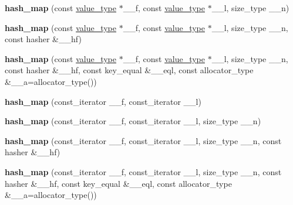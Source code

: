 \begin{DoxyCompactItemize}
{\bfseries hash\+\_\+map} (const \hyperlink{structpair}{value\+\_\+type} $\ast$\+\_\+\+\_\+f, const \hyperlink{structpair}{value\+\_\+type} $\ast$\+\_\+\+\_\+l, size\+\_\+type \+\_\+\+\_\+n)
\item 
\mbox{\label{classhash__map_a50c1ed14be6a9be4ea121e1d2ce2a180}} 
{\bfseries hash\+\_\+map} (const \hyperlink{structpair}{value\+\_\+type} $\ast$\+\_\+\+\_\+f, const \hyperlink{structpair}{value\+\_\+type} $\ast$\+\_\+\+\_\+l, size\+\_\+type \+\_\+\+\_\+n, const hasher \&\+\_\+\+\_\+hf)
\item 
\mbox{\label{classhash__map_a2bd12774902d7ecf2860485790c16fd9}} 
{\bfseries hash\+\_\+map} (const \hyperlink{structpair}{value\+\_\+type} $\ast$\+\_\+\+\_\+f, const \hyperlink{structpair}{value\+\_\+type} $\ast$\+\_\+\+\_\+l, size\+\_\+type \+\_\+\+\_\+n, const hasher \&\+\_\+\+\_\+hf, const key\+\_\+equal \&\+\_\+\+\_\+eql, const allocator\+\_\+type \&\+\_\+\+\_\+a=allocator\+\_\+type())
\item 
\mbox{\label{classhash__map_af27689adca3a8e78e305183ece365939}} 
{\bfseries hash\+\_\+map} (const\+\_\+iterator \+\_\+\+\_\+f, const\+\_\+iterator \+\_\+\+\_\+l)
\item 
\mbox{\label{classhash__map_a201c1a6a94ce3553db76f53ea5224bf1}} 
{\bfseries hash\+\_\+map} (const\+\_\+iterator \+\_\+\+\_\+f, const\+\_\+iterator \+\_\+\+\_\+l, size\+\_\+type \+\_\+\+\_\+n)
\item 
\mbox{\label{classhash__map_a57e588d34e0a64f87bd7017c5b5fbf50}} 
{\bfseries hash\+\_\+map} (const\+\_\+iterator \+\_\+\+\_\+f, const\+\_\+iterator \+\_\+\+\_\+l, size\+\_\+type \+\_\+\+\_\+n, const hasher \&\+\_\+\+\_\+hf)
\item 
\mbox{\label{classhash__map_ac2dfbdb2e4fd01d318d584ee280080ad}} 
{\bfseries hash\+\_\+map} (const\+\_\+iterator \+\_\+\+\_\+f, const\+\_\+iterator \+\_\+\+\_\+l, size\+\_\+type \+\_\+\+\_\+n, const hasher \&\+\_\+\+\_\+hf, const key\+\_\+equal \&\+\_\+\+\_\+eql, const allocator\+\_\+type \&\+\_\+\+\_\+a=allocator\+\_\+type())
\item 
\mbox{\label{classhash__map_add0ba409a09819d963ddc10aaeeb9217}} 

\end{DoxyCompactItemize}
